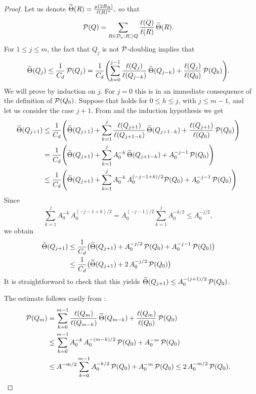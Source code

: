 \begin{proof}
	Let us denote
	${\widetilde{\Theta}}(R) = \frac{\mu(2B_R)}{\ell(R)^n},$ so that
	$${\mathcal P}(Q) = \sum_{R\in{\mathcal D}_\mu:R\supset Q} \frac{\ell(Q)}{\ell(R)} \,{\widetilde{\Theta}}(R).$$
	For $1\leq j \leq m$,
	the fact that $Q_j$ is not ${\mathcal P}$-doubling implies that
	\begin{equation}\label{eqsak33}
		{\widetilde{\Theta}}(Q_j) \leq \frac1{C_d}\,{\mathcal P}(Q_j) = \frac1{C_d}\Biggl (\sum_{k=0}^{j-1} \frac{\ell(Q_j)}{\ell(Q_{j-k})}\,
		{\widetilde{\Theta}}(Q_{j-k})+ \frac{\ell(Q_j)}{\ell(Q_0)}\,{\mathcal P}(Q_0)\Biggr).
	\end{equation}
	We will prove  by induction on $j$. For $j=0$ this is in an immediate consequence of the
	definition of ${\mathcal P}(Q_0)$. Suppose that  holds for $0\leq h\leq j$, with $j\leq m-1$, and let us 
	consider the case $j+1$. From  and the induction hypothesis we get
	\begin{align*}
		{\widetilde{\Theta}}(Q_{j+1}) & \leq  \frac1{C_d}\Biggl ({\widetilde{\Theta}}(Q_{j+1}) + \sum_{k=1}^j \frac{\ell(Q_{j+1})}{\ell(Q_{j+1-k})}\,
		{\widetilde{\Theta}}(Q_{j+1-k})+ \frac{\ell(Q_{j+1})}{\ell(Q_0)}\,{\mathcal P}(Q_0)\Biggr)\\
		&= \frac1{C_d}\Biggl ({\widetilde{\Theta}}(Q_{j+1}) + \sum_{k=1}^j A_0^{-k}\,
		{\widetilde{\Theta}}(Q_{j+1-k})+ A_0^{-j-1}\,{\mathcal P}(Q_0)\Biggr)\\
		&\leq \frac1{C_d}\Biggl ({\widetilde{\Theta}}(Q_{j+1}) + \sum_{k=1}^j A_0^{-k}\,A_0^{(-j-1+k)/2}{\mathcal P}(Q_0)
		+ A_0^{-j-1}\,{\mathcal P}(Q_0)\Biggr)
	\end{align*}
	Since 
	$$\sum_{k=1}^j A_0^{-k}\,A_0^{(-j-1+k)/2} = A_0^{(-j-1)/2}\sum_{k=1}^j A_0^{-k/2}\leq A_0^{-j/2},$$
	we obtain
	\begin{align*}
		{\widetilde{\Theta}}(Q_{j+1})  &\leq  \frac1{C_d}\bigl ({\widetilde{\Theta}}(Q_{j+1}) + A_0^{-j/2}\,{\mathcal P}(Q_0)+ A_0^{-j-1}\,{\mathcal P}(Q_0)\bigr)\\
		&\leq \frac1{C_d}\bigl ({\widetilde{\Theta}}(Q_{j+1}) + 2\,A_0^{-j/2}\,{\mathcal P}(Q_0)\bigr) \\
	\end{align*}
	It is straightforward to check that this yields ${\widetilde{\Theta}}(Q_{j+1})\leq A_0^{-(j+1)/2}\,{\mathcal P}(Q_0)$.
	
	The estimate  follows easily from :
	\begin{align*}
		{\mathcal P}(Q_m) &= \sum_{k=0}^{m-1} \frac{\ell(Q_m)}{\ell(Q_{m-k})}\,
		{\widetilde{\Theta}}(Q_{m-k})+ \frac{\ell(Q_m)}{\ell(Q_0)}\,{\mathcal P}(Q_0)\\
		&\leq \sum_{k=0}^{m-1} A_0^{-k}\,A_0^{-(m-k)/2}\,{\mathcal P}(Q_0)+ A_0^{-m}\,{\mathcal P}(Q_0)\\
		&\leq A^{-m/2}\sum_{k=0}^{m-1} A_0^{-k/2}\,{\mathcal P}(Q_0)+ A_0^{-m}\,{\mathcal P}(Q_0)\leq 2\,A_0^{-m/2}\,{\mathcal P}(Q_0).
	\end{align*}
\end{proof}



